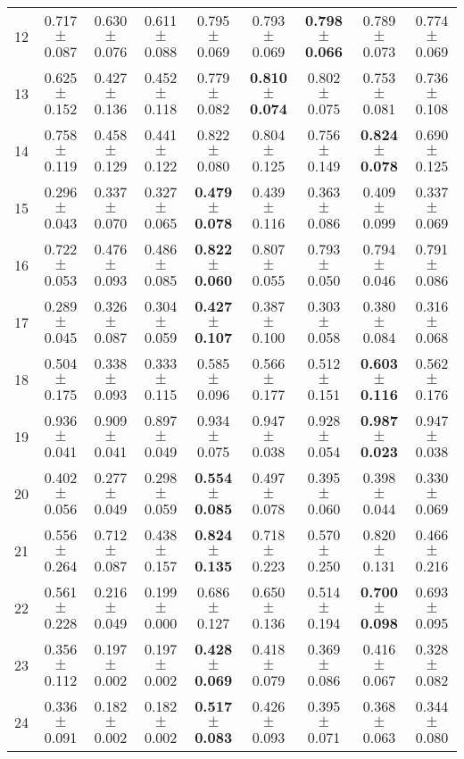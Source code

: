 \begin{table}[!ht]
{\begin{tabular}{r c c c c c c c c}
12 & 0.717 $\pm$ 0.087 & 0.630 $\pm$ 0.076 & 0.611 $\pm$ 0.088 & 0.795 $\pm$ 0.069 & 0.793 $\pm$ 0.069 & \textbf{0.798 $\pm$ 0.066} & 0.789 $\pm$ 0.073 & 0.774 $\pm$ 0.069 \\
13 & 0.625 $\pm$ 0.152 & 0.427 $\pm$ 0.136 & 0.452 $\pm$ 0.118 & 0.779 $\pm$ 0.082 & \textbf{0.810 $\pm$ 0.074} & 0.802 $\pm$ 0.075 & 0.753 $\pm$ 0.081 & 0.736 $\pm$ 0.108 \\
14 & 0.758 $\pm$ 0.119 & 0.458 $\pm$ 0.129 & 0.441 $\pm$ 0.122 & 0.822 $\pm$ 0.080 & 0.804 $\pm$ 0.125 & 0.756 $\pm$ 0.149 & \textbf{0.824 $\pm$ 0.078} & 0.690 $\pm$ 0.125 \\
15 & 0.296 $\pm$ 0.043 & 0.337 $\pm$ 0.070 & 0.327 $\pm$ 0.065 & \textbf{0.479 $\pm$ 0.078} & 0.439 $\pm$ 0.116 & 0.363 $\pm$ 0.086 & 0.409 $\pm$ 0.099 & 0.337 $\pm$ 0.069 \\
16 & 0.722 $\pm$ 0.053 & 0.476 $\pm$ 0.093 & 0.486 $\pm$ 0.085 & \textbf{0.822 $\pm$ 0.060} & 0.807 $\pm$ 0.055 & 0.793 $\pm$ 0.050 & 0.794 $\pm$ 0.046 & 0.791 $\pm$ 0.086 \\
17 & 0.289 $\pm$ 0.045 & 0.326 $\pm$ 0.087 & 0.304 $\pm$ 0.059 & \textbf{0.427 $\pm$ 0.107} & 0.387 $\pm$ 0.100 & 0.303 $\pm$ 0.058 & 0.380 $\pm$ 0.084 & 0.316 $\pm$ 0.068 \\
18 & 0.504 $\pm$ 0.175 & 0.338 $\pm$ 0.093 & 0.333 $\pm$ 0.115 & 0.585 $\pm$ 0.096 & 0.566 $\pm$ 0.177 & 0.512 $\pm$ 0.151 & \textbf{0.603 $\pm$ 0.116} & 0.562 $\pm$ 0.176 \\
19 & 0.936 $\pm$ 0.041 & 0.909 $\pm$ 0.041 & 0.897 $\pm$ 0.049 & 0.934 $\pm$ 0.075 & 0.947 $\pm$ 0.038 & 0.928 $\pm$ 0.054 & \textbf{0.987 $\pm$ 0.023} & 0.947 $\pm$ 0.038 \\
20 & 0.402 $\pm$ 0.056 & 0.277 $\pm$ 0.049 & 0.298 $\pm$ 0.059 & \textbf{0.554 $\pm$ 0.085} & 0.497 $\pm$ 0.078 & 0.395 $\pm$ 0.060 & 0.398 $\pm$ 0.044 & 0.330 $\pm$ 0.069 \\
21 & 0.556 $\pm$ 0.264 & 0.712 $\pm$ 0.087 & 0.438 $\pm$ 0.157 & \textbf{0.824 $\pm$ 0.135} & 0.718 $\pm$ 0.223 & 0.570 $\pm$ 0.250 & 0.820 $\pm$ 0.131 & 0.466 $\pm$ 0.216 \\
22 & 0.561 $\pm$ 0.228 & 0.216 $\pm$ 0.049 & 0.199 $\pm$ 0.000 & 0.686 $\pm$ 0.127 & 0.650 $\pm$ 0.136 & 0.514 $\pm$ 0.194 & \textbf{0.700 $\pm$ 0.098} & 0.693 $\pm$ 0.095 \\
23 & 0.356 $\pm$ 0.112 & 0.197 $\pm$ 0.002 & 0.197 $\pm$ 0.002 & \textbf{0.428 $\pm$ 0.069} & 0.418 $\pm$ 0.079 & 0.369 $\pm$ 0.086 & 0.416 $\pm$ 0.067 & 0.328 $\pm$ 0.082 \\
24 & 0.336 $\pm$ 0.091 & 0.182 $\pm$ 0.002 & 0.182 $\pm$ 0.002 & \textbf{0.517 $\pm$ 0.083} & 0.426 $\pm$ 0.093 & 0.395 $\pm$ 0.071 & 0.368 $\pm$ 0.063 & 0.344 $\pm$ 0.080 \\

\end{tabular}}
\end{table}
